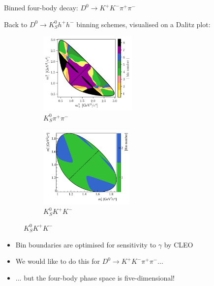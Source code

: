 \documentclass[dvipsnames]{beamer}
\begin{document}
\begin{frame}{Binned four-body decay: $D^0\to K^+K^-\pi^+\pi^-$}
  \begin{center}
    {\large Back to $D^0\to K_S^0h^+h^-$ binning schemes, visualised on a Dalitz plot:}
  \end{center}
  \vspace{-0.3cm}
  \begin{figure}
    \begin{subfigure}{0.45\textwidth}
      \includegraphics[height = 4cm]{Plots/KsPiPi_optimal.png}
      \vspace{-0.3cm}
      \caption*{$K_S^0\pi^+\pi^-$}
    \end{subfigure}%
    \begin{subfigure}{0.45\textwidth}
      \includegraphics[height = 4cm]{Plots/KsKK_binning.png}
      \vspace{-0.3cm}
      \caption*{$K_S^0K^+K^-$}
    \end{subfigure}
  \end{figure}
  \begin{itemize}
    \setlength\itemsep{0.5em}
    \item{Bin boundaries are optimised for sensitivity to $\gamma$ by CLEO}
    \item{We would like to do this for $D^0\to K^+K^-\pi^+\pi^-$...}
    \item{... but the four-body phase space is five-dimensional!}
  \end{itemize}
\end{frame}
\end{document}
